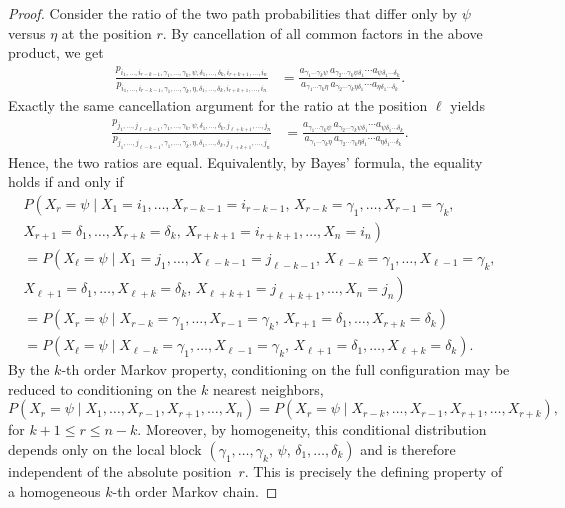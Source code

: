 \documentclass[11pt, a4paper]{article}
\numberwithin{equation}{section}
\theoremstyle{plain}
\theoremstyle{definition}
\begin{document}
\begin{proof}
Consider the ratio of the two path probabilities that differ only by $\psi$ versus $\eta$ at the
position $r$. By cancellation of all common factors in the above product, we get
\begin{align*}
\frac{
p_{i_1,\dots,i_{r-k-1},\gamma_1,\dots,\gamma_k,\psi,\delta_1,\dots,\delta_k,i_{r+k+1},\dots,i_n}
}{
p_{i_1,\dots,i_{r-k-1},\gamma_1,\dots,\gamma_k,\eta,\delta_1,\dots,\delta_k,i_{r+k+1},\dots,i_n}
}
&=
\frac{
a_{\gamma_1\cdots\gamma_k\psi}\,
a_{\gamma_2\cdots\gamma_k\psi\delta_1}\cdots
a_{\psi\delta_1\cdots\delta_k}
}{
a_{\gamma_1\cdots\gamma_k\eta}\,
a_{\gamma_2\cdots\gamma_k\eta\delta_1}\cdots
a_{\eta\delta_1\cdots\delta_k}
}.
\end{align*}
Exactly the same cancellation argument for the ratio at the position $\ell$ yields
\begin{align*}
\frac{
p_{j_1,\dots,j_{\ell-k-1},\gamma_1,\dots,\gamma_k,\psi,\delta_1,\dots,\delta_k,j_{\ell+k+1},\dots,j_n}
}{
p_{j_1,\dots,j_{\ell-k-1},\gamma_1,\dots,\gamma_k,\eta,\delta_1,\dots,\delta_k,j_{\ell+k+1},\dots,j_n}
}
&=
\frac{
a_{\gamma_1\cdots\gamma_k\psi}\,
a_{\gamma_2\cdots\gamma_k\psi\delta_1}\cdots
a_{\psi\delta_1\cdots\delta_k}
}{
a_{\gamma_1\cdots\gamma_k\eta}\,
a_{\gamma_2\cdots\gamma_k\eta\delta_1}\cdots
a_{\eta\delta_1\cdots\delta_k}
}.
\end{align*}
Hence, the two ratios are equal.
Equivalently, by Bayes' formula, the equality holds
if and only if
\begin{align*}
P\!\left(
X_r=\psi \mid 
X_1=i_1,\ldots,X_{r-k-1}=i_{r-k-1},\,
X_{r-k}=\gamma_1,\ldots,X_{r-1}=\gamma_k, \right. \\
\left.
X_{r+1}=\delta_1,\ldots,X_{r+k}=\delta_k,\,
X_{r+k+1}=i_{r+k+1},\ldots,X_n=i_n
\right)
\\
=
P\!\left(
X_\ell=\psi \mid 
X_1=j_1,\ldots,X_{\ell-k-1}=j_{\ell-k-1},\,
X_{\ell-k}=\gamma_1,\ldots,X_{\ell-1}=\gamma_k, \right. \\
\left.
X_{\ell+1}=\delta_1,\ldots,X_{\ell+k}=\delta_k,\,
X_{\ell+k+1}=j_{\ell+k+1},\ldots,X_n=j_n
\right)
\\
=
P\!\left(
X_r=\psi \mid
X_{r-k}=\gamma_1,\ldots,X_{r-1}=\gamma_k,\,
X_{r+1}=\delta_1,\ldots,X_{r+k}=\delta_k
\right)
\\
=
P\!\left(
X_\ell=\psi \mid
X_{\ell-k}=\gamma_1,\ldots,X_{\ell-1}=\gamma_k,\,
X_{\ell+1}=\delta_1,\ldots,X_{\ell+k}=\delta_k
\right).
\end{align*}
By the $k$-th order Markov property, conditioning on the full configuration may be
 reduced to conditioning on the $k$ nearest neighbors, 
\[
P(X_r=\psi \mid X_1,\ldots,X_{r-1},X_{r+1},\ldots,X_n)
=
P(X_r=\psi \mid X_{r-k},\ldots,X_{r-1},X_{r+1},\ldots,X_{r+k}),
\]
for $k+1\le r\le n-k$. Moreover, by homogeneity, this conditional distribution depends only on the local block
$(\gamma_1,\ldots,\gamma_k,\,\psi,\,\delta_1,\ldots,\delta_k)$ and is therefore independent
of the absolute position~$r$.
This is precisely the defining property of a homogeneous $k$-th order Markov chain.


\end{proof}
\end{document}
